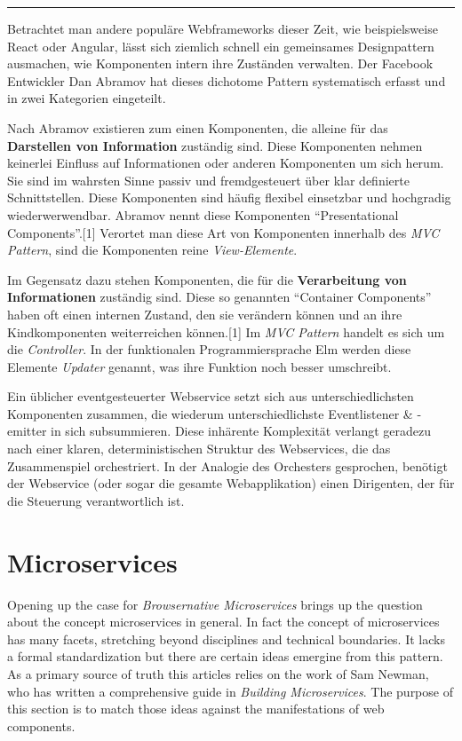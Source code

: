 \documentclass[]{assets/latex/ieee}
\begin{document}
\begin{center}\rule{0.5\linewidth}{\linethickness}\end{center}

Betrachtet man andere populäre Webframeworks dieser Zeit, wie
beispielsweise React oder Angular, lässt sich ziemlich schnell ein
gemeinsames Designpattern ausmachen, wie Komponenten intern ihre
Zuständen verwalten. Der Facebook Entwickler Dan Abramov hat dieses
dichotome Pattern systematisch erfasst und in zwei Kategorien
eingeteilt.

Nach Abramov existieren zum einen Komponenten, die alleine für das
\textbf{Darstellen von Information} zuständig sind. Diese Komponenten
nehmen keinerlei Einfluss auf Informationen oder anderen Komponenten um
sich herum. Sie sind im wahrsten Sinne passiv und fremdgesteuert über
klar definierte Schnittstellen. Diese Komponenten sind häufig flexibel
einsetzbar und hochgradig wiederwerwendbar. Abramov nennt diese
Komponenten ``Presentational Components''.{[}1{]} Verortet man diese Art
von Komponenten innerhalb des \emph{MVC Pattern}, sind die Komponenten
reine \emph{View-Elemente}.

Im Gegensatz dazu stehen Komponenten, die für die \textbf{Verarbeitung
von Informationen} zuständig sind. Diese so genannten ``Container
Components'' haben oft einen internen Zustand, den sie verändern können
und an ihre Kindkomponenten weiterreichen können.{[}1{]} Im \emph{MVC
Pattern} handelt es sich um die \emph{Controller}. In der funktionalen
Programmiersprache Elm werden diese Elemente \emph{Updater} genannt, was
ihre Funktion noch besser umschreibt.

Ein üblicher eventgesteuerter Webservice setzt sich aus
unterschiedlichsten Komponenten zusammen, die wiederum
unterschiedlichste Eventlistener \& -emitter in sich subsummieren. Diese
inhärente Komplexität verlangt geradezu nach einer klaren,
deterministischen Struktur des Webservices, die das Zusammenspiel
orchestriert. In der Analogie des Orchesters gesprochen, benötigt der
Webservice (oder sogar die gesamte Webapplikation) einen Dirigenten, der
für die Steuerung verantwortlich ist.

\section{Microservices}\label{microservices}

Opening up the case for \emph{Browsernative Microservices} brings up the
question about the concept microservices in general. In fact the concept
of microservices has many facets, stretching beyond disciplines and
technical boundaries. It lacks a formal standardization but there are
certain ideas emergine from this pattern. As a primary source of truth
this articles relies on the work of Sam Newman, who has written a
comprehensive guide in \emph{Building Microservices}. The purpose of
this section is to match those ideas against the manifestations of web
components.
\end{document}
